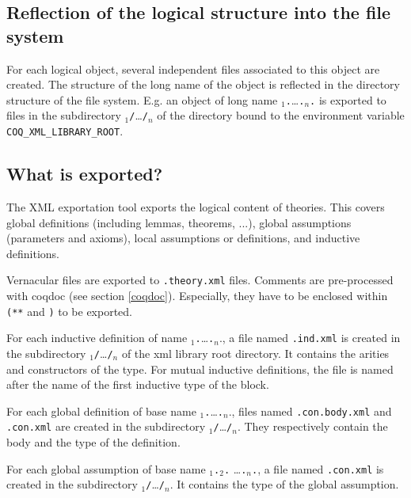 \subsection{Reflection of the logical structure into the file system}

For each {\Coq} logical object, several independent files associated
to this object are created.  The structure of the long name of the
object is reflected in the directory structure of the file system.
E.g. an object of long name 
{\ident$_1$}{\tt .}{\ldots}{\tt .}{\ident$_n$}{\tt .}{\ident} is exported to files in the
subdirectory {\ident$_1$}{\tt /}{\ldots}{\tt /}{\ident$_n$} of the directory 
bound to the environment variable {\tt COQ\_XML\_LIBRARY\_ROOT}.

\subsection{What is exported?}

The XML exportation tool exports the logical content of {\Coq}
theories. This covers global definitions (including lemmas, theorems,
...), global assumptions (parameters and axioms), local assumptions or
definitions, and inductive definitions.

Vernacular files are exported to {\tt .theory.xml} files. 
Comments are pre-processed with {\sf coqdoc} (see section
\ref{coqdoc}). Especially, they have to be enclosed within {\tt (**}
and {\tt *)} to be exported.

For each inductive definition of name
{\ident$_1$}{\tt .}{\ldots}{\tt .}{\ident$_n$}.{\ident}, a file named
{\ident}{\tt .ind.xml} is created in the subdirectory
{\ident$_1$}{\tt /}{\ldots}{\tt /}{\ident$_n$} of the xml library root
directory. It contains the arities and constructors of the type. For mutual inductive definitions, the file is named after the
name of the first inductive type of the block.

For each global definition of base name
{\ident$_1$}{\tt .}{\ldots}{\tt .}{\ident$_n$}.{\ident}, files named
{\tt {\ident}.con.body.xml} and {\tt {\ident}.con.xml} are created in the
subdirectory {\ident$_1$}{\tt /}{\ldots}{\tt /}{\ident$_n$}. They
respectively contain the body and the type of the definition.

For each global assumption of base name {\ident$_1$}{\tt .}{\ident$_2$}{\tt .}
{\ldots}{\tt .}{\ident$_n$}{\tt .}{\ident}, a file
named {\ident}{\tt .con.xml} is created in the subdirectory
{\ident$_1$}{\tt /}{\ldots}{\tt /}{\ident$_n$}.  It contains the type of the
global assumption.

